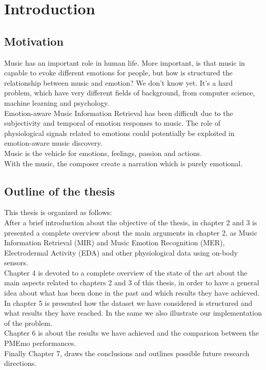 \chapter{Introduction}
\label{Introduction}
\pagestyle{plain}

\vspace{0.5cm}

\section{Motivation}
Music has an important role in human life. More important, is that music in capable to evoke different emotions for people, but how is structured the relationship between music and emotion? We don't know yet. It's a hard problem, which have very different fields of background, from computer science, machine learning and psychology.
\\ \indent
Emotion-aware Music Information Retrieval has been difficult due to the subjectivity and temporal of emotion responses to music. The role of physiological signals related to emotions could potentially be exploited in emotion-aware music discovery.
\\ \indent
Music is the vehicle for emotions, feelings, passion and actions.
\\
With the music, the composer create a narration which is purely emotional.

\section{Outline of the thesis}
This thesis is organized as follows:
\\ \indent
After a brief introduction about the objective of the thesis, in chapter 2 and 3 is presented a complete overview about the main arguments in chapter 2, as Music Information Retrieval (MIR) and Music Emotion Recognition (MER), Electrodermal Activity (EDA) and other physiological data using on-body sensors.
\\ \indent
Chapter 4 is devoted to a complete overview of the state of the art about the main aspects related to chapters 2 and 3 of this thesis, in order to have a general idea about what has been done in the past and which results they have achieved.
\\ \indent
In chapter 5 is presented how the dataset we have considered is structured and what results they have reached. In the same  we also illustrate our implementation of the problem.
\\ \indent
Chapter 6 is about the results we have achieved and the comparison between the PMEmo performances.
\\ \indent
Finally Chapter 7, draws the conclusions and outlines possible future research directions.

